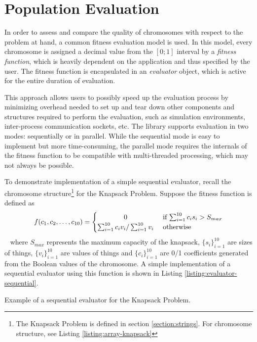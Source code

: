 \section{Population Evaluation}
In order to assess and compare the quality of chromosomes with respect to the problem at hand, a common fitness evaluation model is used. In this model, every chromosome is assigned a decimal value from the $[0;1]$ interval by a \textit{fitness function}, which is heavily dependent on the application and thus specified by the user. The fitness function is encapsulated in an \textit{evaluator} object, which is active for the entire duration of evaluation.

This approach allows users to possibly speed up the evaluation process by minimizing overhead needed to set up and tear down other components and structures required to perform the evaluation, such as simulation environments, inter-process communication sockets, etc. The library supports evaluation in two modes: sequentially or in parallel. While the sequential mode is easy to implement but more time-consuming, the parallel mode requires the internals of the fitness function to be compatible with multi-threaded processing, which may not always be possible.

To demonstrate implementation of a simple sequential evaluator, recall the chromosome structure\footnote{The Knapsack Problem is defined in section \ref{section:strings}. For chromosome structure, see Listing \ref{listing:array-knapsack}} for the Knapsack Problem. Suppose the fitness function is defined as
~
\begin{align}
	f(c_1, c_2, \dots, c_{10})
	=
	\begin{cases} 
		\hfill 0 \hfill & \text{ if $\sum_{i=1}^{10} c_i s_i>S_{max}$} \\
		\hfill \sum_{i=1}^{10} c_i v_i / \sum_{i=1}^{10} v_i \hfill & \text{ otherwise} \\
	\end{cases}
\end{align}
~
where $S_{max}$ represents the maximum capacity of the knapsack, $\{s_i\}_{i=1}^{10}$ are sizes of things, $\{v_i\}_{i=1}^{10}$ are values of things and $\{c_i\}_{i=1}^{10}$ are 0/1 coefficients generated from the Boolean values of the chromosome. A simple implementation of a sequential evaluator using this function is shown in Listing \ref{listing:evaluator-sequential}.

\begin{listing}[ht]
	\caption{Example of a sequential evaluator for the Knapsack Problem.}
	\label{listing:evaluator-sequential}
\end{listing}


